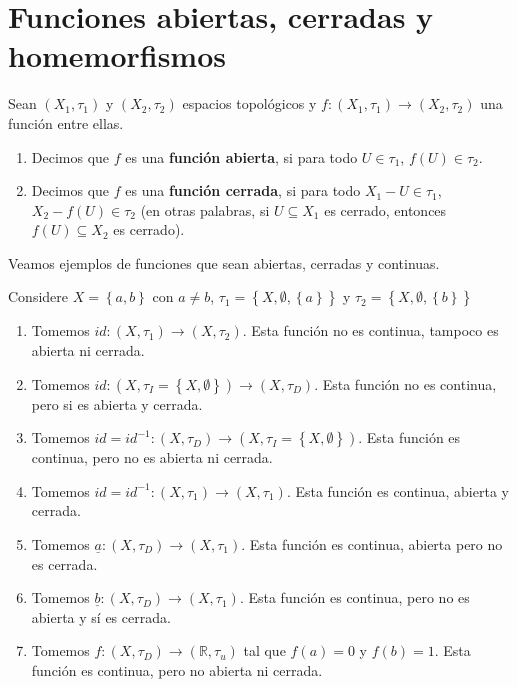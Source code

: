 \documentclass[12pt]{report}
\theoremstyle{largebreak}
\newcommand\cf[3]{\ensuremath{#1:#2\rightarrow#3}}
\begin{document}
    \section{Funciones abiertas, cerradas y homemorfismos}

    \begin{mydef}
        Sean $(X_1,\tau_1)$ y $(X_2,\tau_2)$ espacios topológicos y $\cf{f}{(X_1,\tau_1)}{(X_2,\tau_2)}$ una función entre ellas.
        \begin{enumerate}
            \item Decimos que $f$ es una \textbf{función abierta}, si para todo $U\in\tau_1$, $f(U)\in\tau_2$.
            \item Decimos que $f$ es una \textbf{función cerrada}, si para todo $X_1-U\in\tau_1$, $X_2-f(U)\in\tau_2$ (en otras palabras, si $U\subseteq X_1$ es cerrado, entonces $f(U)\subseteq X_2$ es cerrado).
        \end{enumerate}
    \end{mydef}

    Veamos ejemplos de funciones que sean abiertas, cerradas y continuas.

    Considere $X=\left\{a,b \right\}$ con $a\neq b$, $\tau_1=\left\{ X,\emptyset,\left\{a\right\} \right\}$ y $\tau_2=\left\{ X,\emptyset,\left\{b\right\} \right\}$

    \begin{enumerate}
        \item Tomemos $\cf{id}{(X,\tau_1)}{(X,\tau_2)}$. Esta función no es continua, tampoco es abierta ni cerrada.
        \item Tomemos $\cf{id}{(X,\tau_I=\left\{X,\emptyset \right\})}{(X,\tau_D)}$. Esta función no es continua, pero si es abierta y cerrada.
        \item Tomemos $\cf{id=id^{-1}}{(X,\tau_D)}{(X,\tau_I=\left\{X,\emptyset \right\})}$. Esta función es continua, pero no es abierta ni cerrada.
        \item Tomemos $\cf{id=id^{-1}}{(X,\tau_1)}{(X,\tau_1)}$. Esta función es continua, abierta y cerrada.
        \item Tomemos $\cf{\underline{a}}{(X,\tau_D)}{(X,\tau_1)}$. Esta función es continua, abierta pero no es cerrada.
        \item Tomemos $\cf{\underline{b}}{(X,\tau_D)}{(X,\tau_1)}$. Esta función es continua, pero no es abierta y sí es cerrada.
        \item Tomemos $\cf{f}{(X,\tau_D)}{(\mathbb{R},\tau_u)}$ tal que $f(a)=0$ y $f(b)=1$. Esta función es continua, pero no abierta ni cerrada.
    \end{enumerate}
\end{document}
